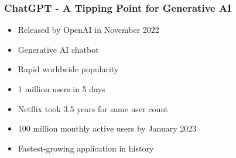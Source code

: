     

\begin{frame}[fragile]\frametitle{ChatGPT - A Tipping Point for Generative AI}
    \begin{itemize}
        \item Released by OpenAI in November 2022
        \item Generative AI chatbot
        \item Rapid worldwide popularity
        \item 1 million users in 5 days
        \item Netflix took 3.5 years for same user count
        \item 100 million monthly active users by January 2023
        \item Fastest-growing application in history
    \end{itemize}
\end{frame}


	
